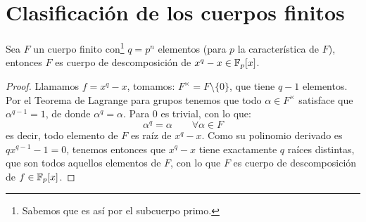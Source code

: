 \section{Clasificación de los cuerpos finitos}
\begin{prop}
    Sea $F$ un cuerpo finito con\footnote{Sabemos que es así por el subcuerpo primo.} $q=p^n$ elementos (para $p$ la característica de $F$), entonces $F$ es cuerpo de descomposición de $x^q-x\in \mathbb{F}_p[x]$.
    \begin{proof}
        Llamamos $f=x^q-x$, tomamos: $F^{\times} = F\setminus\{0\}$, que tiene $q-1$ elementos. Por el Teorema de Lagrange para grupos tenemos que todo $\alpha\in F^{\times}$ satisface que $\alpha^{q-1}=1$, de donde $\alpha^q = \alpha$. Para $0$ es trivial, con lo que:
        \begin{equation*}
            \alpha^q = \alpha \qquad \forall \alpha\in F
        \end{equation*}
        es decir, todo elemento de $F$ es raíz de $x^q-x$. Como su polinomio derivado es $qx^{q-1}-1 = 0$, tenemos entonces que $x^q-x$ tiene exactamente $q$ raíces distintas, que son todos aquellos elementos de $F$, con lo que $F$ es cuerpo de descomposición de $f\in \mathbb{F}_p[x]$.
    \end{proof}
\end{prop}
